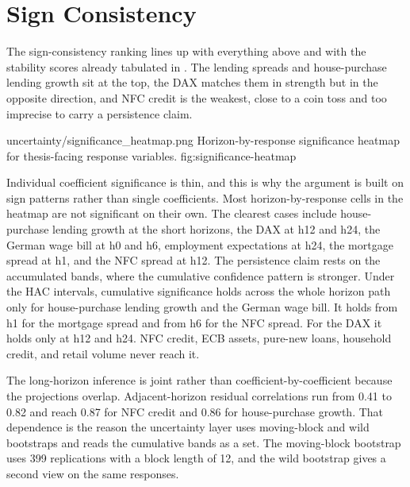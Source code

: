 \section{Sign Consistency}

The sign-consistency ranking lines up with everything above and with the stability scores already tabulated in . The lending spreads and house-purchase lending growth sit at the top, the DAX matches them in strength but in the opposite direction, and NFC credit is the weakest, close to a coin toss and too imprecise to carry a persistence claim.

\thesisfigure
  {uncertainty/significance_heatmap.png}
  {Horizon-by-response significance heatmap for thesis-facing response variables.}
  {fig:significance-heatmap}

Individual coefficient significance is thin, and this is why the argument is built on sign patterns rather than single coefficients. Most horizon-by-response cells in the heatmap are not significant on their own. The clearest cases include house-purchase lending growth at the short horizons, the DAX at h12 and h24, the German wage bill at h0 and h6, employment expectations at h24, the mortgage spread at h1, and the NFC spread at h12. The persistence claim rests on the accumulated bands, where the cumulative confidence pattern is stronger. Under the HAC intervals, cumulative significance holds across the whole horizon path only for house-purchase lending growth and the German wage bill. It holds from h1 for the mortgage spread and from h6 for the NFC spread. For the DAX it holds only at h12 and h24. NFC credit, ECB assets, pure-new loans, household credit, and retail volume never reach it.

The long-horizon inference is joint rather than coefficient-by-coefficient because the projections overlap. Adjacent-horizon residual correlations run from 0.41 to 0.82 and reach 0.87 for NFC credit and 0.86 for house-purchase growth. That dependence is the reason the uncertainty layer uses moving-block and wild bootstraps and reads the cumulative bands as a set. The moving-block bootstrap uses 399 replications with a block length of 12, and the wild bootstrap gives a second view on the same responses.

